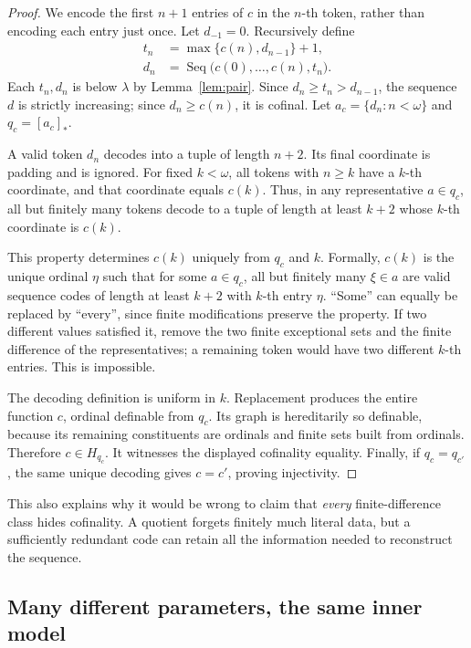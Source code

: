 \documentclass[11pt,letterpaper]{article}
\theoremstyle{definition}
\numberwithin{equation}{section}
\newcommand{\Seq}{\operatorname{Seq}}
\newcommand{\qclass}[1]{[#1]_{*}}
\begin{document}
\begin{proof}
We encode the first $n+1$ entries of $c$ in the $n$-th token, rather than encoding each entry just once. Let $d_{-1}=0$. Recursively define
\begin{align}
t_n&=\max\{c(n),d_{n-1}\}+1,\\
d_n&=\Seq\bigl(c(0),\ldots,c(n),t_n\bigr).
\end{align}
Each $t_n,d_n$ is below $\lambda$ by Lemma~\ref{lem:pair}. Since $d_n\ge t_n>d_{n-1}$, the sequence $d$ is strictly increasing; since $d_n\ge c(n)$, it is cofinal. Let $a_c=\{d_n:n<\omega\}$ and $q_c=\qclass{a_c}$.

A valid token $d_n$ decodes into a tuple of length $n+2$. Its final coordinate is padding and is ignored. For fixed $k<\omega$, all tokens with $n\ge k$ have a $k$-th coordinate, and that coordinate equals $c(k)$. Thus, in any representative $a\in q_c$, all but finitely many tokens decode to a tuple of length at least $k+2$ whose $k$-th coordinate is $c(k)$.

This property determines $c(k)$ uniquely from $q_c$ and $k$. Formally, $c(k)$ is the unique ordinal $\eta$ such that for some $a\in q_c$, all but finitely many $\xi\in a$ are valid sequence codes of length at least $k+2$ with $k$-th entry $\eta$. ``Some'' can equally be replaced by ``every'', since finite modifications preserve the property. If two different values satisfied it, remove the two finite exceptional sets and the finite difference of the representatives; a remaining token would have two different $k$-th entries. This is impossible.

The decoding definition is uniform in $k$. Replacement produces the entire function $c$, ordinal definable from $q_c$. Its graph is hereditarily so definable, because its remaining constituents are ordinals and finite sets built from ordinals. Therefore $c\in H_{q_c}$. It witnesses the displayed cofinality equality. Finally, if $q_c=q_{c'}$, the same unique decoding gives $c=c'$, proving injectivity.
\end{proof}

This also explains why it would be wrong to claim that \emph{every} finite-difference class hides cofinality. A quotient forgets finitely much literal data, but a sufficiently redundant code can retain all the information needed to reconstruct the sequence.

\subsection{Many different parameters, the same inner model}
\end{document}

